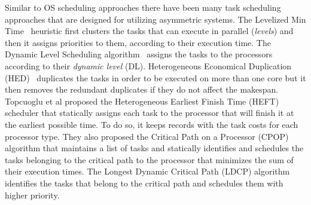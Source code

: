 
Similar to OS scheduling approaches there have been many task scheduling approaches that are designed for utilizing asymmetric systems.
The Levelized Min Time~\cite{Hetero95} heuristic first clusters the tasks that can execute in parallel (\textit{levels}) and then it assigns priorities to them, according to their execution time.
The Dynamic Level Scheduling algorithm~\cite{Hetero93} assigns the tasks to the processors according to their \textit{dynamic level} (DL).
Heterogeneous Economical Duplication (HED)~\cite{Dup09} duplicates the tasks in order to be executed on more than one core but it then
removes the redundant duplicates if they do not affect the makespan. 
Topcuoglu et al proposed the Heterogeneous Earliest Finish Time (HEFT) scheduler that statically assigns each task to the processor that will finish it at the earliest possible time. To do so, it keeps records with the task costs for each processor type.
They also proposed the Critical Path on a Processor (CPOP) algorithm \cite{HEFT} that maintains a list of tasks and statically identifies and schedules the tasks belonging to the critical path  to the processor that minimizes the sum of their execution times. 
The Longest Dynamic Critical Path (LDCP) algorithm \cite{LDCP} identifies the tasks that belong to the critical path and schedules them with higher priority.

